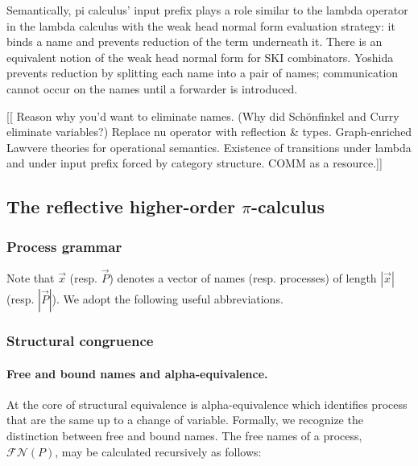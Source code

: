 \documentclass{llncs}
\newcommand{\lliftb}{\langle\!|}
\newcommand{\rliftb}{|\!\rangle}
\newcommand{\lpquote}{\ulcorner}
\newcommand{\rpquote}{\urcorner}
\newcommand{\pzero}{\mathbin{0}}
\newcommand{\freenames}[1]{\mathbin{\mathcal{FN}(#1)}}
\newcommand{\lift}[2]{#1 \lliftb #2 \rliftb}
\newcommand{\clift}[1]{\lliftb #1 \rliftb}
\newcommand{\quotep}[1]{\lpquote #1 \rpquote}
\newcommand{\dropn}[1]{\rpquote #1 \lpquote}
\newcommand{\bc}{\mathbin{\mathbf{::=}}}
\begin{document}
Semantically, pi calculus' input prefix plays a role similar to the lambda operator in the lambda calculus with the weak head normal form evaluation strategy: it binds a name and prevents reduction of the term underneath it.  There is an equivalent notion of the weak head normal form for SKI combinators.  Yoshida prevents reduction by splitting each name into a pair of names; communication cannot occur on the names until a forwarder is introduced.

[[ Reason why you'd want to eliminate names.  (Why did Schönfinkel and Curry eliminate variables?)  Replace nu operator with reflection \& types.  Graph-enriched Lawvere theories for operational semantics.  Existence of transitions under lambda and under input prefix forced by category structure.  COMM as a resource.]]

\subsection{The reflective higher-order $\pi$-calculus}

\subsubsection{Process grammar}\label{subsub:process_grammar}


Note that $\vec{x}$ (resp. $\vec{P}$) denotes a vector of names
(resp. processes) of length $|\vec{x}|$ (resp. $|\vec{P}|$). We adopt
the following useful abbreviations.


\subsubsection{Structural congruence}

\paragraph{Free and bound names and alpha-equivalence.} At the
core of structural equivalence is alpha-equivalence which identifies
process that are the same up to a change of variable. Formally, we
recognize the distinction between free and bound names. The free names
of a process, $\freenames{P}$, may be calculated recursively as
follows:
\end{document}
